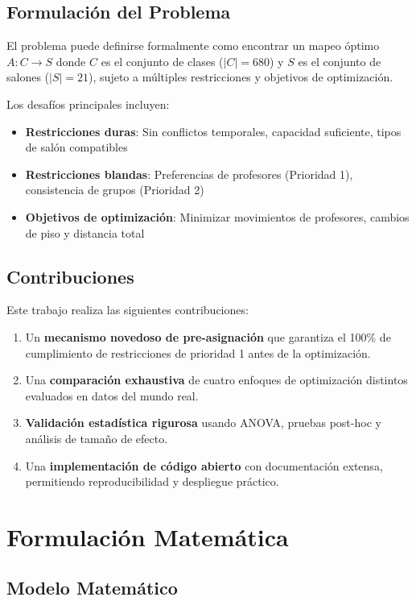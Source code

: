 \documentclass[12pt,a4paper]{article}
\begin{document}
\subsection{Formulación del Problema}

El problema puede definirse formalmente como encontrar un mapeo óptimo $A: C \rightarrow S$ donde $C$ es el conjunto de clases ($|C|=680$) y $S$ es el conjunto de salones ($|S|=21$), sujeto a múltiples restricciones y objetivos de optimización.

Los desafíos principales incluyen:
\begin{itemize}
\item \textbf{Restricciones duras}: Sin conflictos temporales, capacidad suficiente, tipos de salón compatibles
\item \textbf{Restricciones blandas}: Preferencias de profesores (Prioridad 1), consistencia de grupos (Prioridad 2)
\item \textbf{Objetivos de optimización}: Minimizar movimientos de profesores, cambios de piso y distancia total
\end{itemize}

\subsection{Contribuciones}

Este trabajo realiza las siguientes contribuciones:

\begin{enumerate}
\item Un \textbf{mecanismo novedoso de pre-asignación} que garantiza el 100\% de cumplimiento de restricciones de prioridad 1 antes de la optimización.
\item Una \textbf{comparación exhaustiva} de cuatro enfoques de optimización distintos evaluados en datos del mundo real.
\item \textbf{Validación estadística rigurosa} usando ANOVA, pruebas post-hoc y análisis de tamaño de efecto.
\item Una \textbf{implementación de código abierto} con documentación extensa, permitiendo reproducibilidad y despliegue práctico.
\end{enumerate}

\section{Formulación Matemática}

\subsection{Modelo Matemático}
\end{document}
